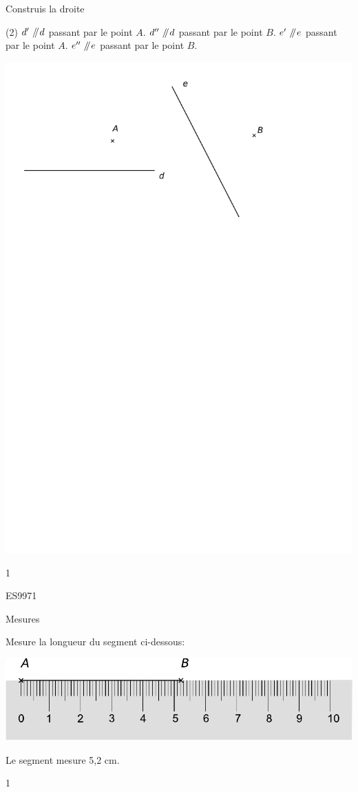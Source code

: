 \documentclass[a4paper,11pt]{report}
\begin{document}
\begin{exop}{Construis la droite 
\begin{tasks}[after-item-skip = 0.4em](2)
	\task  $d'\mathbin{\;\!/\mkern-5mu/\!} d$ passant par le point $A$.
	\task  $d''\mathbin{\;\!/\mkern-5mu/\!} d$ passant par le point $B$.
	\task  $e'\mathbin{\;\!/\mkern-5mu/\!} e$ passant par le point $A$.
	\task  $e''\mathbin{\;\!/\mkern-5mu/\!} e$ passant par le point $B$.
\end{tasks}
	
\begin{center}
\includegraphics[scale=0.8]{media/es-11/13-9}
\end{center}
    }{1}
\end{exop}

\begin{exol}{ES9}{97}{1}
\end{exol}
\begin{resolu}{Mesures}{Mesure la longueur du segment ci-dessous:

\begin{center}
  \includegraphics[scale=0.5]{media/es-11/regleseg}  
\end{center}
{\color{blue} Le segment mesure 5,2 cm.}
}
{1}
\end{resolu}
\end{document}
